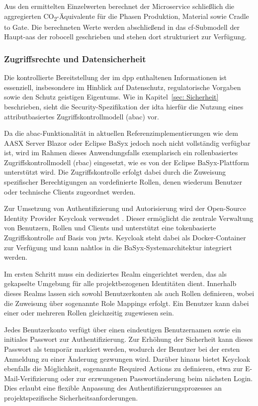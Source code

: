 Aus den ermittelten Einzelwerten berechnet der Microservice schließlich die aggregierten CO\textsubscript{2}-Äquivalente für die Phasen Produktion, Material sowie Cradle to Gate. 
Die berechneten Werte werden abschließend in das \acs{cf}-Submodell der Haupt-\acs{aas} der robocell geschrieben und stehen dort strukturiert zur Verfügung.

\subsubsection{Zugriffsrechte und Datensicherheit}

Die kontrollierte Bereitstellung der im \acs{dpp} enthaltenen Informationen ist essenziell, insbesondere im Hinblick auf Datenschutz, regulatorische Vorgaben sowie den Schutz geistigen Eigentums.  
Wie in Kapitel~\ref{sec: Sicherheit} beschrieben, sieht die Security-Spezifikation der \acs{idta} hierfür die Nutzung eines attributbasiertes Zugriffskontrollmodell (\acs{abac}) vor.

Da die \acs{abac}-Funktionalität in aktuellen Referenzimplementierungen wie dem AASX Server Blazor oder Eclipse BaSyx jedoch noch nicht vollständig verfügbar ist, wird im Rahmen dieses Anwendungsfalls exemplarisch ein rollenbasiertes Zugriffskontrollmodell (\acs{rbac}) eingesetzt, wie es von der Eclipse BaSyx-Plattform unterstützt wird.  
Die Zugriffskontrolle erfolgt dabei durch die Zuweisung spezifischer Berechtigungen an vordefinierte Rollen, denen wiederum Benutzer oder technische Clients zugeordnet werden.

Zur Umsetzung von Authentifizierung und Autorisierung wird der Open-Source Identity Provider Keycloak verwendet \cite{Keycloak}.  
Dieser ermöglicht die zentrale Verwaltung von Benutzern, Rollen und Clients und unterstützt eine tokenbasierte Zugriffskontrolle auf Basis von \acsp{jwt}.  
Keycloak steht dabei als Docker-Container zur Verfügung und kann nahtlos in die BaSyx-Systemarchitektur integriert werden.

Im ersten Schritt muss ein dediziertes Realm eingerichtet werden, das als gekapselte Umgebung für alle projektbezogenen Identitäten dient.  
Innerhalb dieses Realms lassen sich sowohl Benutzerkonten als auch Rollen definieren, wobei die Zuweisung über sogenannte Role Mappings erfolgt.  
Ein Benutzer kann dabei einer oder mehreren Rollen gleichzeitig zugewiesen sein.

Jedes Benutzerkonto verfügt über einen eindeutigen Benutzernamen sowie ein initiales Passwort zur Authentifizierung.  
Zur Erhöhung der Sicherheit kann dieses Passwort als temporär markiert werden, wodurch der Benutzer bei der ersten Anmeldung zu einer Änderung gezwungen wird.  
Darüber hinaus bietet Keycloak ebenfalls die Möglichkeit, sogenannte Required Actions zu definieren, etwa zur E-Mail-Verifizierung oder zur erzwungenen Passwortänderung beim nächsten Login.  
Dies erlaubt eine flexible Anpassung des Authentifizierungsprozesses an projektspezifische Sicherheitsanforderungen.

